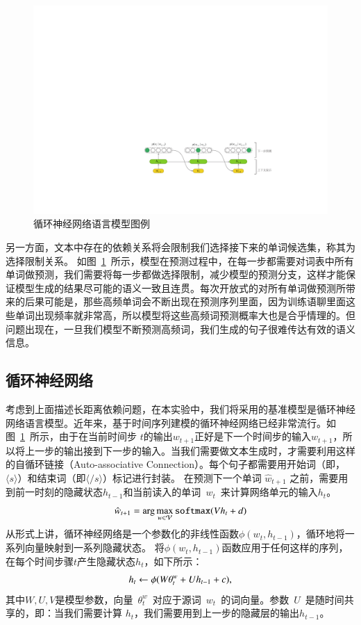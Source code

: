 \begin{figure}[!b]
  \centering
  \includegraphics[width=.99\columnwidth]{./figures/lm.pdf}
  \caption{循环神经网络语言模型图例}
  \label{fig:lm}
\end{figure}

另一方面，文本中存在的依赖关系将会限制我们选择接下来的单词候选集，称其为选择限制关系。
如图~\ref{fig:lm}~所示，模型在预测过程中，在每一步都需要对词表中所有单词做预测，我们需要将每一步都做选择限制，减少模型的预测分支，这样才能保证模型生成的结果尽可能的语义一致且连贯。每次开放式的对所有单词做预测所带来的后果可能是，那些高频单词会不断出现在预测序列里面，因为训练语聊里面这些单词出现频率就非常高，所以模型将这些高频词预测概率大也是合乎情理的。但问题出现在，一旦我们模型不断预测高频词，我们生成的句子很难传达有效的语义信息。

\subsection{循环神经网络}
考虑到上面描述长距离依赖问题，在本实验中，我们将采用的基准模型是循环神经网络语言模型。近年来，基于时间序列建模的循环神经网络已经非常流行。如图~\ref{fig:lm}~所示，由于在当前时间步 $t$的输出$w_{t+1}$正好是下一个时间步的输入$w_{t+1}$，所以将上一步的输出接到下一步的输入。当我们需要做文本生成时，才需要利用这样的自循环链接（Auto-associative Connection）。每个句子都需要用开始词（即，$\langle s\rangle$）和结束词（即$\langle / s\rangle$）标记进行封装。 在预测下一个单词 $\hat w_{t+1}$ 之前，需要用到前一时刻的隐藏状态$h_{t-1}$和当前读入的单词~$w_t$~来计算网络单元的输入$h_t$。
\begin{equation}
\setlength{\abovedisplayskip}{6pt}
\setlength{\belowdisplayskip}{6pt}
  \hat w_{t+1}=\arg\max_{w\in\mathcal{V}} \mathtt{softmax}(Vh_t+d)
\end{equation}
从形式上讲，循环神经网络是一个参数化的非线性函数$\phi(w_t,h_{t-1})$，循环地将一系列向量映射到一系列隐藏状态。 将$\phi(w_t,h_{t-1})$函数应用于任何这样的序列，在每个时间步骤$t$产生隐藏状态$h_t$，如下所示：
\begin{equation}
\setlength{\abovedisplayskip}{6pt}
\setlength{\belowdisplayskip}{6pt}
  h_t \leftarrow  \phi(W\theta^w_t + U h_{t-1} +c),
\end{equation}
其中$ W,U,V $是模型参数，向量~$\theta^w_t$~对应于源词~$w_t$~的词向量。参数~$U$~是随时间共享的，即：当我们需要计算 $h_t$，我们需要用到上一步的隐藏层的输出$h_{t-1}$。

